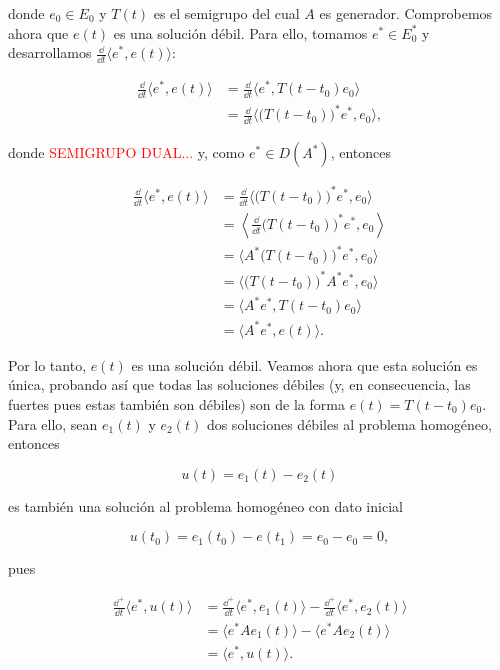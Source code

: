 donde $e_0 \in E_0$ y $T(t)$ es el semigrupo del cual $A$ es generador. Comprobemos ahora que $e(t)$ es una solución débil. Para ello, tomamos $e^* \in E_0^*$ y desarrollamos $\displaystyle\frac{\dd}{\dd t}\langle e^*, e(t)\rangle$:

\begin{align*}
    \frac{\dd}{\dd t}\langle e^*, e(t)\rangle &= \frac{\dd}{\dd t}\langle e^*, T(t-t_0)e_0\rangle\\
    &= \frac{\dd}{\dd t}\Big\langle \big(T(t-t_0)\big)^*e^*, e_0\Big\rangle,
\end{align*}

donde \textcolor{red}{SEMIGRUPO DUAL...} y, como $e^* \in D(A^*)$, entonces

\begin{align*}
    \frac{\dd}{\dd t}\langle e^*, e(t)\rangle &= \frac{\dd}{\dd t}\Big\langle \big(T(t-t_0)\big)^*e^*, e_0\Big\rangle\\
    &= \left \langle\frac{\dd}{\dd t}\big(T(t-t_0)\big)^*e^*, e_0 \right\rangle\\
    &= \Big\langle A^*\big(T(t-t_0)\big)^*e^*, e_0\Big\rangle\\
    &= \Big\langle \big(T(t-t_0)\big)^*A^*e^*, e_0\Big\rangle\\
    &=\langle A^*e^*, T(t-t_0)e_0\rangle\\
    &=\langle A^*e^*, e(t) \rangle.
\end{align*}

Por lo tanto, $e(t)$ es una solución débil. Veamos ahora que esta solución es única, probando así que todas las soluciones débiles (y, en consecuencia, las fuertes pues estas también son débiles) son de la forma $e(t) = T(t-t_0)e_0$. Para ello, sean $e_1(t)$ y $e_2(t)$ dos soluciones débiles al problema homogéneo, entonces

\[u(t) = e_1(t) - e_2(t)\]

es también una solución al problema homogéneo con dato inicial

\[u(t_0) = e_1(t_0) - e(t_1) = e_0 - e_0 = 0,\]

pues

\begin{align*}
    \frac{\dd^+}{\dd t}\langle e^*, u(t) \rangle &= \frac{\dd^+}{\dd t}\langle e^*, e_1(t)\rangle - \frac{\dd^+}{\dd t}\langle e^*, e_2(t)\rangle\\
    &= \langle e^* Ae_1(t)\rangle - \langle e^* Ae_2(t)\rangle\\
    &= \langle e^*, u(t) \rangle.
\end{align*}

